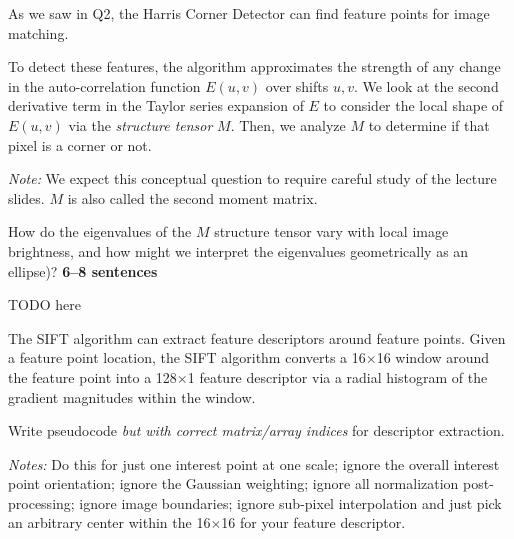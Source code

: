 \documentclass{csci1430}
\begin{document}
\pagebreak


\begin{question}[points=3,drawbox=false]
As we saw in Q2, the Harris Corner Detector can find feature points for image matching.

To detect these features, the algorithm approximates the strength of any change in the auto-correlation function $E(u, v)$ over shifts $u,v$. We look at the second derivative term in the Taylor series expansion of $E$ to consider the local shape of $E(u, v)$ via the \emph{structure tensor} $M$. Then, we analyze $M$ to determine if that pixel is a corner or not.

\textit{Note:} We expect this conceptual question to require careful study of the lecture slides. $M$ is also called the second moment matrix.
\end{question}

\begin{orangebox}
How do the eigenvalues of the $M$ structure tensor vary with local image brightness, and how might we interpret the eigenvalues geometrically as an ellipse)? \textbf{6--8 sentences}
\end{orangebox}

\begin{answer}[height=16]
TODO here
\end{answer}

\pagebreak

\begin{question}[points=5,drawbox=false]
The SIFT algorithm can extract feature descriptors around feature points. Given a feature point location, the SIFT algorithm converts a 16$\times$16 window around the feature point into a 128$\times$1 feature descriptor via a radial histogram of the gradient magnitudes within the window.
\end{question}

\begin{orangebox}
Write pseudocode \emph{but with correct matrix/array indices} for descriptor extraction.

\emph{Notes:} Do this for just one interest point at one scale; ignore the overall interest point orientation; ignore the Gaussian weighting; ignore all normalization post-processing; ignore image boundaries; ignore sub-pixel interpolation and just pick an arbitrary center within the 16$\times$16 for your feature descriptor.
\end{orangebox}
\end{document}
